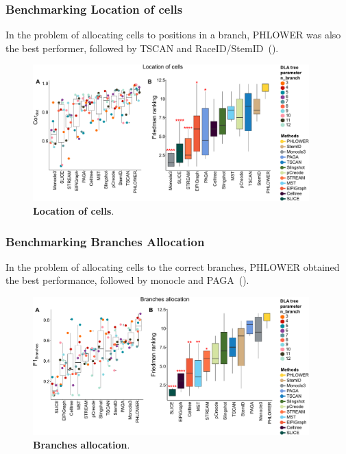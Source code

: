 \subsubsection{Benchmarking Location of cells}
In the problem of allocating cells to positions in a branch, PHLOWER was also the best performer, followed by TSCAN and RaceID/StemID~().
\begin{figure}[!h]
	\centering
	\includegraphics[width=0.95\textwidth]{Cordist/fig}
	\vspace{0.1cm}
	\caption[Location of cells]{
	\textbf{Location of cells}.}
	\label{fig:Cordist}
\end{figure}
\subsubsection{Benchmarking Branches Allocation}
In the problem of allocating cells to the correct branches, PHLOWER obtained the best performance, followed by monocle and PAGA~().


\begin{figure}[!ht]
	\centering
	\includegraphics[width=0.95\textwidth]{F1branches/fig}
	\vspace{0.1cm}
	\caption[Branches allocation]{
	\textbf{Branches allocation}.}
	\label{fig:f1branches}
\end{figure}


